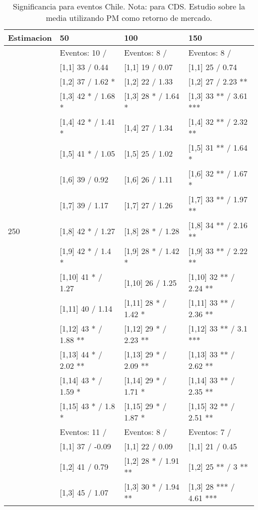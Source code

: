 \begin{table}

\caption{Significancia para eventos Chile. Nota: para CDS. Estudio sobre la media utilizando PM como retorno de mercado.}
\centering
\begin{tabular}[t]{llll}
\toprule
Estimacion & 50 & 100 & 150\\
\midrule
 & Eventos:  10 / & Eventos:  8 / & Eventos:  8 /\\
 & {}[1,1] 33  / 0.44 & {}[1,1] 19  / 0.07 & {}[1,1] 25  / 0.74\\
 & {}[1,2] 37  / 1.62 * & {}[1,2] 22  / 1.33 & {}[1,2] 27  / 2.23 **\\
 & {}[1,3] 42 * / 1.68 * & {}[1,3] 28 * / 1.64 * & {}[1,3] 33 ** / 3.61 ***\\
 & {}[1,4] 42 * / 1.41 * & {}[1,4] 27  / 1.34 & {}[1,4] 32 ** / 2.32 **\\
\addlinespace
 & {}[1,5] 41 * / 1.05 & {}[1,5] 25  / 1.02 & {}[1,5] 31 ** / 1.64 *\\
 & {}[1,6] 39  / 0.92 & {}[1,6] 26  / 1.11 & {}[1,6] 32 ** / 1.67 *\\
 & {}[1,7] 39  / 1.17 & {}[1,7] 27  / 1.26 & {}[1,7] 33 ** / 1.97 **\\
250 & {}[1,8] 42 * / 1.27 & {}[1,8] 28 * / 1.28 & {}[1,8] 34 ** / 2.16 **\\
 & {}[1,9] 42 * / 1.4 * & {}[1,9] 28 * / 1.42 * & {}[1,9] 33 ** / 2.22 **\\
\addlinespace
 & {}[1,10] 41 * / 1.27 & {}[1,10] 26  / 1.25 & {}[1,10] 32 ** / 2.24 **\\
 & {}[1,11] 40  / 1.14 & {}[1,11] 28 * / 1.42 * & {}[1,11] 33 ** / 2.36 **\\
 & {}[1,12] 43 * / 1.88 ** & {}[1,12] 29 * / 2.23 ** & {}[1,12] 33 ** / 3.1 ***\\
 & {}[1,13] 44 * / 2.02 ** & {}[1,13] 29 * / 2.09 ** & {}[1,13] 33 ** / 2.62 **\\
 & {}[1,14] 43 * / 1.59 * & {}[1,14] 29 * / 1.71 * & {}[1,14] 33 ** / 2.35 **\\
\addlinespace
 & {}[1,15] 43 * / 1.8 * & {}[1,15] 29 * / 1.87 * & {}[1,15] 32 ** / 2.51 **\\
 & Eventos:  11 / & Eventos:  8 / & Eventos:  7 /\\
 & {}[1,1] 37  / -0.09 & {}[1,1] 22  / 0.09 & {}[1,1] 21  / 0.45\\
 & {}[1,2] 41  / 0.79 & {}[1,2] 28 * / 1.91 ** & {}[1,2] 25 ** / 3 **\\
 & {}[1,3] 45  / 1.07 & {}[1,3] 30 * / 1.94 ** & {}[1,3] 28 *** / 4.61 ***\\

\end{tabular}
\end{table}
